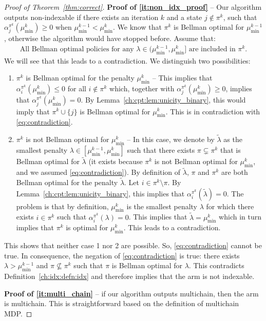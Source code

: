 \begin{proof}[Proof of Theorem~\ref{thm:correct}]
    \textbf{Proof of \ref{it:non_idx_proof}} -- 
    Our algorithm outputs non-indexable if there exists an iteration $k$ and a state $j\notin\pi^k$, such that $\alpha^{\pi^k}_j(\mu^k_{\min})\ge0$ when $\mu^{k-1}_{\min}<\mu^k_{\min}$.
    We know that $\pi^k$ is Bellman optimal for $\mu^{k-1}_{\min}$, otherwise the algorithm would have stopped before.
    Assume that:
    \begin{align}
        \label{eq:contradiction}
        \text{All Bellman optimal policies for any $\lambda\in(\mu^{k-1}_{\min},\mu^k_{\min}]$ are included in $\pi^k$.}
    \end{align}
    We will see that this leads to a contradiction. We distinguish two possibilities: 
    \begin{enumerate}
        \item $\pi^k$ is Bellman optimal for the penalty $\mu^k_{\min}$ -- This implies that $\alpha^{\pi^k}_i(\mu^k_{\min})\le0$ for all $i\not\in\pi^k$ which, together with $\alpha^{\pi^k}_j(\mu^k_{\min})\ge0$, implies that $\alpha^{\pi^k}_j(\mu^k_{\min})=0$.
            By Lemma~\ref{ch:cpt:lem:unicity_binary}, this would imply that $\pi^k\cup\{j\}$ is Bellman optimal for $\mu^k_{\min}$.
            This is in contradiction with \eqref{eq:contradiction}.
        \item $\pi^k$ is not Bellman optimal for $\mu^k_{\min}$ -- In this case, we denote by $\tilde{\lambda}$ as the smallest penalty $\lambda\in[\mu^{k-1}_{\min},\mu^{k}_{\min}]$ such that there exists $\pi\subsetneq\pi^k$ that is Bellman optimal for $\tilde{\lambda}$ (it exists because $\pi^k$ is not Bellman optimal for $\mu^k_{\min}$, and we assumed \eqref{eq:contradiction}).
            By definition of $\tilde{\lambda}$, $\pi$ and $\pi^k$ are both Bellman optimal for the penalty $\tilde{\lambda}$.
            Let $i\in\pi^k\setminus\pi$.
            By Lemma~\ref{ch:cpt:lem:unicity_binary}, this implies that $\alpha^{\pi^k}_i(\tilde{\lambda})=0$.
            The problem is that by definition, $\mu^k_{\min}$ is the smallest penalty $\lambda$ for which there exists $i\in\pi^k$ such that $\alpha^{\pi^k}_i(\lambda)=0$.
            This implies that $\tilde{\lambda}=\mu^k_{\min}$ which in turn implies that $\pi^k$ is optimal for $\mu^k_{\min}$.
            This leads to a contradiction.
    \end{enumerate}
    This shows that neither case 1 nor 2 are possible. So, \eqref{eq:contradiction} cannot be true.
    In consequence, the negation of \eqref{eq:contradiction} is true: there exists $\lambda>\mu^{k-1}_{\min}$ and $\pi\not\subseteq \pi^k$ such that $\pi$ is Bellman optimal for $\lambda$.
    This contradicts Definition~\ref{ch:idx:defn:idx} and therefore implies that the arm is not indexable. 

    \medskip
    \textbf{Proof of \ref{it:multi_chain}} -- if our algorithm outputs multichain, then the arm is multichain.
    This is straightforward based on the definition of multichain MDP.
\end{proof}


